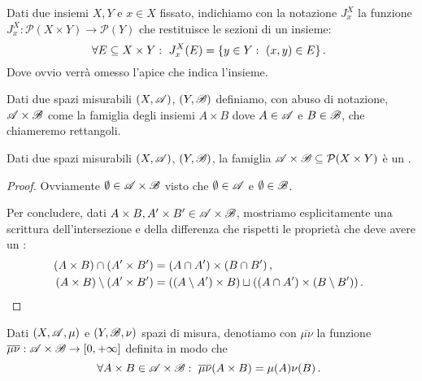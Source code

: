 \begin{definition}\label{def:SezioneProdotto}
	Dati due insiemi $X,Y$ e $x\in X$ fissato, indichiamo con la notazione $J^X_x$ la funzione $J^X_x:\mathcal P(X\times Y) \to \mathcal P(Y)$ che restituisce le sezioni di un insieme:
	\begin{equation*}
		\forall E\subseteq X\times Y:\ J^X_x(E)=\{y\in Y:\ (x,y)\in E\}\, \text{. }
	\end{equation*}
	Dove ovvio verrà omesso l'apice che indica l'insieme.
\end{definition}

\begin{definition}\label{def:SemianelloProdotto}
	Dati due spazi misurabili $(X,\mathscr A)$, $(Y,\mathscr B)$ definiamo, con abuso di notazione, $\mathscr A\times\mathscr B$ come la famiglia degli insiemi $A\times B$ dove $A\in\mathscr A$ e $B\in\mathscr B$, che chiameremo rettangoli.
\end{definition}

\begin{proposition}\label{prop:SemianelloProdotto}
	Dati due spazi misurabili $(X,\mathscr A)$, $(Y,\mathscr B)$, la famiglia $\mathscr A\times\mathscr B\subseteq \mathcal P(X\times Y)$ è un \semiring{}.
\end{proposition}
\begin{proof}
	Ovviamente $\emptyset\in\mathscr A\times\mathscr B$ visto che $\emptyset\in\mathscr A$ e $\emptyset\in\mathscr B$.
	
	Per concludere, dati $A\times B, A'\times B'\in\mathscr A\times\mathscr B$, mostriamo esplicitamente una scrittura dell'intersezione e della differenza che rispetti le proprietà che deve avere un \semiring{}:
	\begin{align*}
		(A\times B)\cap (A'\times B') &= (A\cap A')\times(B\cap B')\, \text{, } \\
		(A\times B)\setminus (A'\times B') &= ((A\setminus A')\times B)\sqcup( (A\cap A')\times (B\setminus B') )\, \text{. }
	\end{align*}
\end{proof}

\begin{definition}\label{def:PremisuraProdotto}
	Dati $(X,\mathscr A,\mu)$ e $(Y,\mathscr B,\nu)$ spazi di misura, denotiamo con $\overline{\mu\nu}$ la funzione $\overline{\mu\nu}:\mathscr A\times\mathscr B\to[0,+\infty]$ definita in modo che 
	\begin{equation*}
		\forall A\times B\in\mathscr A\times\mathscr B:\ \overline{\mu\nu}(A\times B)=\mu(A)\nu(B)\, \text{. }
	\end{equation*}
\end{definition}

